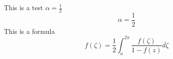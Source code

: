 \documentclass{article}
\begin{document}
This is a test $\alpha=\frac 12$
\[
\alpha=\frac 12 
\]
This is a formula
\[
f(\zeta) = \frac12 \int_{a}^{2\pi} \frac{f(\zeta)}{1-f(z)} d\zeta
\]
\end{document}
